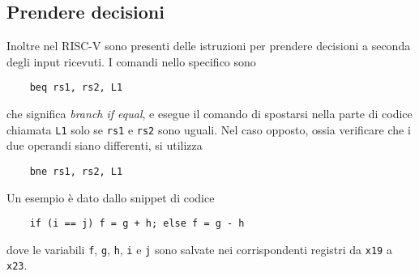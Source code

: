 \documentclass[a4paper,12pt]{article}
\theoremstyle{break}
\newcommand{\code}[1]{\texttt{#1}}
\numberwithin{equation}{section}
\begin{document}
\subsection{Prendere decisioni}
Inoltre nel RISC-V sono presenti delle istruzioni per prendere decisioni a seconda degli input ricevuti. I comandi nello specifico sono 
\begin{verbatim}
    beq rs1, rs2, L1
\end{verbatim}
che significa \textit{branch if equal}, e esegue il comando di spostarsi nella parte di codice chiamata \code{L1} solo se \code{rs1} e \code{rs2} sono uguali.
Nel caso opposto, ossia verificare che i due operandi siano differenti, si utilizza
\begin{verbatim}
    bne rs1, rs2, L1
\end{verbatim}
Un esempio è dato dallo snippet di codice 
\begin{verbatim}
    if (i == j) f = g + h; else f = g - h
\end{verbatim}
dove le variabili \code{f}, \code{g}, \code{h}, \code{i} e \code{j} sono salvate nei corrispondenti registri da \code{x19} a \code{x23}. 
\end{document}
